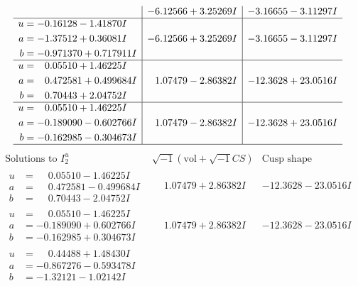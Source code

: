 \documentclass[1p]{elsarticle_modified}
\theoremstyle{definition}
\newcommand{\I}{\sqrt{-1}}
\begin{document}
$$\begin{array}{c|c|c}
 & -6.12566 + 3.25269 I & -3.16655 - 3.11297 I \\ \hline\begin{aligned}
u &= -0.16128 - 1.41870 I \\
a &= -1.37512 + 0.36081 I \\
b &= -0.971370 + 0.717911 I\end{aligned}
 & -6.12566 + 3.25269 I & -3.16655 - 3.11297 I \\ \hline\begin{aligned}
u &= \phantom{-}0.05510 + 1.46225 I \\
a &= \phantom{-}0.472581 + 0.499684 I \\
b &= \phantom{-}0.70443 + 2.04752 I\end{aligned}
 & \phantom{-}1.07479 - 2.86382 I & -12.3628 + 23.0516 I \\ \hline\begin{aligned}
u &= \phantom{-}0.05510 + 1.46225 I \\
a &= -0.189090 - 0.602766 I \\
b &= -0.162985 - 0.304673 I\end{aligned}
 & \phantom{-}1.07479 - 2.86382 I & -12.3628 + 23.0516 I\\
 \hline 
 \end{array}$$\newpage$$\begin{array}{c|c|c}  
\text{Solutions to }I^u_{2}& \I (\text{vol} + \sqrt{-1}CS) & \text{Cusp shape}\\
 \hline 
\begin{aligned}
u &= \phantom{-}0.05510 - 1.46225 I \\
a &= \phantom{-}0.472581 - 0.499684 I \\
b &= \phantom{-}0.70443 - 2.04752 I\end{aligned}
 & \phantom{-}1.07479 + 2.86382 I & -12.3628 - 23.0516 I \\ \hline\begin{aligned}
u &= \phantom{-}0.05510 - 1.46225 I \\
a &= -0.189090 + 0.602766 I \\
b &= -0.162985 + 0.304673 I\end{aligned}
 & \phantom{-}1.07479 + 2.86382 I & -12.3628 - 23.0516 I \\ \hline\begin{aligned}
u &= \phantom{-}0.44488 + 1.48430 I \\
a &= -0.867276 - 0.593478 I \\
b &= -1.32121 - 1.02142 I\end{aligned}

\end{array}$$
\end{document}
